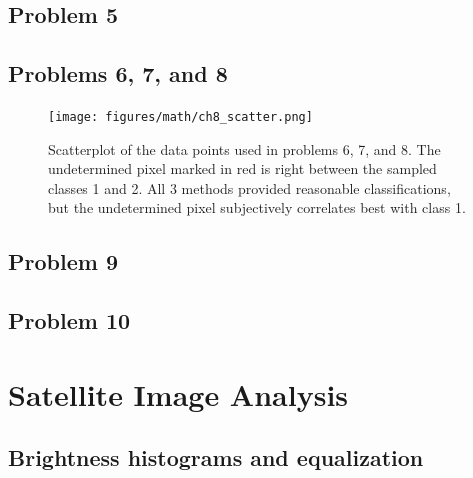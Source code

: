 \documentclass[12pt]{article}
\begin{document}
\subsection{Problem 5}

\subsection{Problems 6, 7, and 8}

\begin{center}

\end{center}

\begin{figure}
    \texttt{[image: figures/math/ch8\_scatter.png]}
    \caption{Scatterplot of the data points used in problems 6, 7, and 8. The undetermined pixel marked in red is right between the sampled classes 1 and 2. All 3 methods provided reasonable classifications, but the undetermined pixel subjectively correlates best with class 1. }
\end{figure}

\subsection{Problem 9}

\begin{center}

\end{center}

\subsection{Problem 10}

\section{Satellite Image Analysis}

\subsection{Brightness histograms and equalization}
\end{document}
